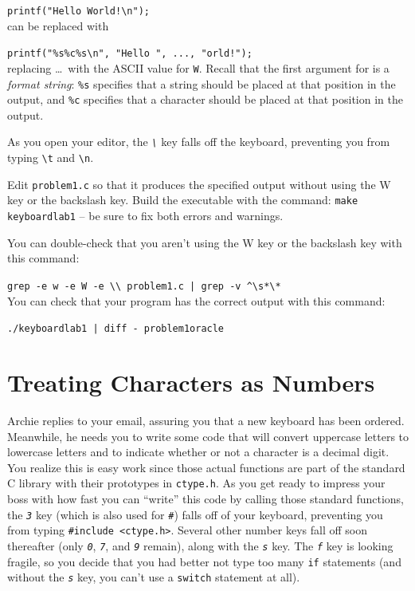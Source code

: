 \lstinline{printf("Hello World!\n");} \\
can be replaced with

\lstinline{printf("%s%c%s\n", "Hello ", ..., "orld!");} \\
replacing \dots\ with the ASCII value for \texttt{W}. Recall that the first
argument for  is a \textit{format string}: \texttt{\%s}
specifies that a string should be placed at that position in the output, and
\texttt{\%c} specifies that a character should be placed at that position in
the output.

As you open your editor, the \textit{\texttt{\textbackslash}} key falls off the
keyboard, preventing you from typing \texttt{\textbackslash t} and
\texttt{\textbackslash n}.

Edit \texttt{problem1.c} so that it produces the specified output without using
the W key or the backslash key. Build the executable with the command:
\texttt{make keyboardlab1} -- be sure to fix both errors and warnings.

You can double-check that you aren't using the W key or the backslash key with
this command:

\texttt{grep -e w -e W -e
\textquotesingle\textbackslash\textbackslash\textquotesingle\ problem1.c | grep
-v \textquotesingle{}\^{}\textbackslash{}s*\textbackslash{}*\textquotesingle} \\
You can check that your program has the correct output with this command:

\texttt{./keyboardlab1 | diff - problem1oracle}


\section{Treating Characters as Numbers}

Archie replies to your email, assuring you that a new keyboard has been
ordered. Meanwhile, he needs you to write some code that will convert uppercase
letters to lowercase letters and to indicate whether or not a character is a
decimal digit. You realize this is easy work since those actual functions are
part of the standard C library with their prototypes in \texttt{ctype.h}. As
you get ready to impress your boss with how fast you can ``write'' this code by
calling those standard functions, the \textit{\texttt{3}} key (which is also
used for \textit{\texttt{\#}}) falls off of your keyboard, preventing you from
typing \lstinline{#include <ctype.h>}. Several other number keys fall off soon
thereafter (only \textit{\texttt{0}}, \textit{\texttt{7}}, and
\textit{\texttt{9}} remain), along with the \textit{\texttt{s}} key. The
\textit{\texttt{f}} key is looking fragile, so you decide that you had better
not type too many \lstinline{if} statements (and without the
\textit{\texttt{s}} key, you can't use a \lstinline{switch} statement at all).

